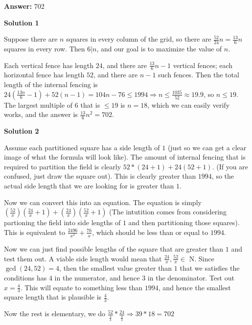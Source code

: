 \begin{enumerate}
 
 \textbf{Answer: }702



\textbf{Solution 1}

Suppose there are $n$ squares in every column of the grid, so there are $\frac{52}{24}n = \frac {13}6n$ squares in every row. Then $6|n$, and our goal is to maximize the value of $n$. 

 Each vertical fence has length $24$, and there are $\frac{13}{6}n - 1$ vertical fences; each horizontal fence has length $52$, and there are $n-1$ such fences. Then the total length of the internal fencing is $24\left(\frac{13n}{6}-1\right) + 52(n-1) = 104n - 76 \le 1994 \Longrightarrow n \le \frac{1035}{52} \approx 19.9$, so $n \le 19$. The largest multiple of $6$ that is $\le 19$ is $n = 18$, which we can easily verify works, and the answer is $\frac{13}{6}n^2 = \boxed{702}$.

 



\textbf{Solution 2}

Assume each partitioned square has a side length of $1$ (just so we can get a clear image of what the formula will look like). The amount of internal fencing that is required to partition the field is clearly $52*(24+1) + 24(52+1)$. (If you are confused, just draw the square out). This is clearly greater than $1994$, so the actual side length that we are looking for is greater than $1$.

 Now we can convert this into an equation. The equation is simply $(\frac{52}{x})(\frac{24}{x}+1) + (\frac{24}{x})(\frac{52}{x}+1)$ (The intutition comes from considering partioning the field into side lengths of $1$ and then partitioning those squares). This is equivalent to $\frac{2496}{x^2} + \frac{76}{x}$, which should be less than or equal to $1994$.

 Now we can just find possible lengths of the square that are greater than $1$ and test them out. A viable side length would mean that $\frac{24}{x}, \frac{52}{x} \in$ N. Since $\gcd(24,52) = 4$, then the smallest value greater than $1$ that we satisfies the conditions has $4$ in the numerator, and hence $3$ in the denominator. Test out $x=\frac{4}{3}$. This will equate to something less than $1994$, and hence the smallest square length that is plausible is $\frac{4}{3}$. 

 Now the rest is elementary, we do $\frac{52}{\frac{4}{3}} * \frac{24}{\frac{4}{3}} \Rightarrow 39*18 = \boxed{702}$




\end{enumerate}

